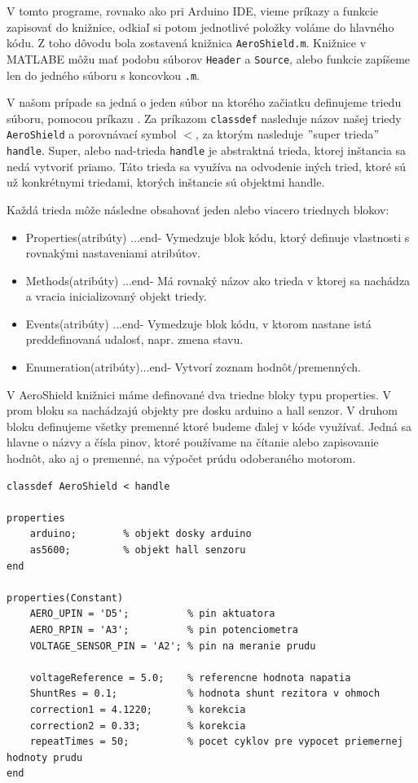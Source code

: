 V tomto programe, rovnako ako pri Arduino IDE, vieme príkazy a funkcie zapisovať do knižnice, odkiaľ si potom jednotlivé položky voláme do hlavného kódu. Z toho dôvodu bola zostavená knižnica \verb|AeroShield.m|. Knižnice v MATLABE môžu mať podobu súborov \verb|Header| a \verb|Source|, alebo funkcie zapíšeme len do jedného súboru s koncovkou \verb|.m|. 

V našom prípade sa jedná o jeden súbor na ktorého začiatku definujeme triedu súboru, pomocou príkazu . Za príkazom \verb|classdef| nasleduje názov našej triedy \verb|AeroShield| a porovnávací symbol $<$, za ktorým nasleduje $"$super trieda$"$ \verb|handle|. Super, alebo nad-trieda \verb|handle| je abstraktná trieda, ktorej inštancia sa nedá vytvoriť priamo. Táto trieda sa využíva na odvodenie iných tried, ktoré sú už konkrétnymi triedami, ktorých inštancie sú objektmi handle\cite{HANDLE}. 

Každá trieda môže následne obsahovať jeden alebo viacero triednych blokov: 
\begin{itemize}
	\item Properties(atribúty) ...end- Vymedzuje blok kódu, ktorý definuje vlastnosti s rovnakými nastaveniami atribútov.
	\item Methods(atribúty)    ...end- Má rovnaký názov ako trieda v ktorej sa nachádza a vracia inicializovaný objekt triedy.
	\item Events(atribúty)     ...end- Vymedzuje blok kódu, v ktorom nastane istá preddefinovaná udalosť, napr. zmena stavu. 
	\item Enumeration(atribúty)...end- Vytvorí zoznam hodnôt/premenných. 
\end{itemize}

V AeroShield knižnici máme definované dva triedne bloky typu properties. V prom bloku sa nachádzajú objekty pre dosku arduino a hall senzor. V druhom bloku definujeme všetky premenné ktoré budeme ďalej v kóde využívať. Jedná sa hlavne o názvy a čísla pinov, ktoré používame na čítanie alebo zapisovanie hodnôt, ako aj o premenné, na výpočet prúdu odoberaného motorom. 

\begin{lstlisting}[caption={Knižnica AeroShield.m properties.},captionpos=b]
classdef AeroShield < handle

properties
	arduino;		% objekt dosky arduino 
	as5600;			% objekt hall senzoru
end

properties(Constant)
	AERO_UPIN = 'D5';          % pin aktuatora 
	AERO_RPIN = 'A3';          % pin potenciometra
	VOLTAGE_SENSOR_PIN = 'A2'; % pin na meranie prudu
	
	voltageReference = 5.0;    % referencne hodnota napatia 
	ShuntRes = 0.1;            % hodnota shunt rezitora v ohmoch
	correction1 = 4.1220;	   % korekcia  				  
	correction2 = 0.33;        % korekcia
	repeatTimes = 50;          % pocet cyklov pre vypocet priemernej hodnoty prudu 
end		
\end{lstlisting}
		
